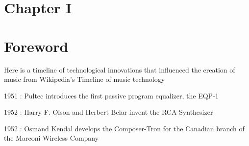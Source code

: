 \documentclass[12pt]{report}
\begin{document}
\vspace{\baselineskip}

\vspace{\baselineskip}

\vspace{\baselineskip}

\vspace{\baselineskip}

\vspace{\baselineskip}



\newpage

\vspace{\baselineskip}
\vspace{\baselineskip}
\section*{Chapter I}
\section*{Foreword}

\vspace{\baselineskip}
Here is a timeline of technological innovations that influenced the creation of music from Wikipedia’s Timeline of music technology\par


\vspace{\baselineskip}
\begin{adjustwidth}{0.5in}{0.0in}
1951 : Pultec introduces the first passive program equalizer, the EQP-1\par

\end{adjustwidth}

\begin{adjustwidth}{0.5in}{0.0in}
1952 : Harry F. Olson and Herbert Belar invent the RCA Synthesizer\par

\end{adjustwidth}

\begin{adjustwidth}{0.5in}{0.0in}
1952 : Osmand Kendal develops the Composer-Tron for the Canadian branch of the Marconi Wireless Company\par

\end{adjustwidth}
\end{document}
